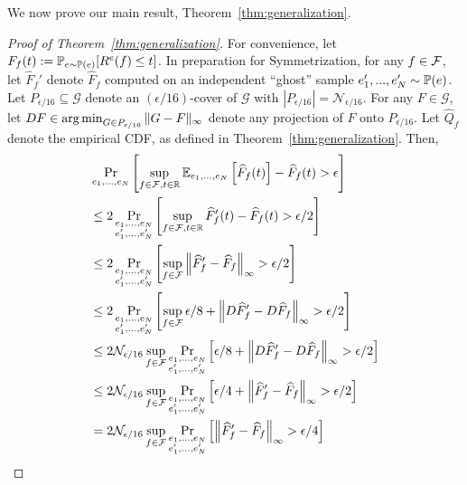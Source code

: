 \documentclass{article}
\begin{document}
We now prove our main result, Theorem~\ref{thm:generalization}.
\begin{proof}[Proof of Theorem~\ref{thm:generalization}]
    For convenience, let $F_f(t) := \mathbb{P}_{e \sim \mathbb{P}(e)}[R^e(f) \leq t]$.
    In preparation for Symmetrization, for any $f \in \mathcal{F}$, let $\widehat F_f'$ denote $\widehat F_f$ computed on an independent ``ghost'' sample $e_1',...,e_N' \sim \mathbb{P}(e)$. Let $P_{\epsilon/16} \subseteq \mathcal{G}$ denote an $(\epsilon/16)$-cover of $\mathcal{G}$ with $|P_{\epsilon/16}| = \mathcal{N}_{\epsilon/16}$. For any $F \in \mathcal{G}$, let $DF \in \operatorname*{arg\,min}_{G \in P_{\epsilon/16}} \|G - F\|_\infty$ denote any projection of $F$ onto $P_{\epsilon/16}$. Let $\hat Q_f$ denote the empirical CDF, as defined in Theorem~\ref{thm:generalization}. Then,
    \begin{align}
        & \Pr_{e_1,...,e_N} \left[ \sup_{f \in \calF, t \in \bbR} \E_{e_1,...,e_N} \left[ \widehat F_f(t) \right] - \widehat F_f(t) > \epsilon \right] \\
        \label{l1}
        & \leq 2 \Pr_{\substack{e_1,...,e_N\\e_1',...,e_N'}} \left[ \sup_{f \in \calF, t \in \R} \widehat F_f'(t) - \widehat F_f(t) > \epsilon/2 \right] \\
        \label{l2}
        & \leq 2 \Pr_{\substack{e_1,...,e_N\\e_1',...,e_N'}} \left[ \sup_{f \in \calF} \left\| \widehat F_f' - \widehat F_f \right\|_\infty > \epsilon/2 \right] \\
        \label{l3}
        & \leq 2 \Pr_{\substack{e_1,...,e_N\\e_1',...,e_N'}} \left[ \sup_{f \in \mathcal{F}} \epsilon/8 + \left\| D \widehat F_f' - D \widehat F_f \right\|_\infty > \epsilon/2 \right] \\
        \label{l4}
        & \leq 2 \mathcal{N}_{\epsilon/16} \sup_{f \in \mathcal{F}} \Pr_{\substack{e_1,...,e_N\\e_1',...,e_N'}} \left[ \epsilon/8 + \left\| D \widehat F_f' - D \widehat F_f \right\|_\infty > \epsilon/2 \right] \\
        \label{l5}
        & \leq 2 \mathcal{N}_{\epsilon/16} \sup_{f \in \mathcal{F}} \Pr_{\substack{e_1,...,e_N\\e_1',...,e_N'}} \left[ \epsilon/4 + \left\| \widehat F_f' - \widehat F_f \right\|_\infty > \epsilon/2 \right] \\
        \label{l6}
        & = 2 \mathcal{N}_{\epsilon/16} \sup_{f \in \mathcal{F}} \Pr_{\substack{e_1,...,e_N\\e_1',...,e_N'}} \left[ \left\| \widehat F_f' - \widehat F_f \right\|_\infty > \epsilon/4 \right] \\

\end{align}
\end{proof}
\end{document}
